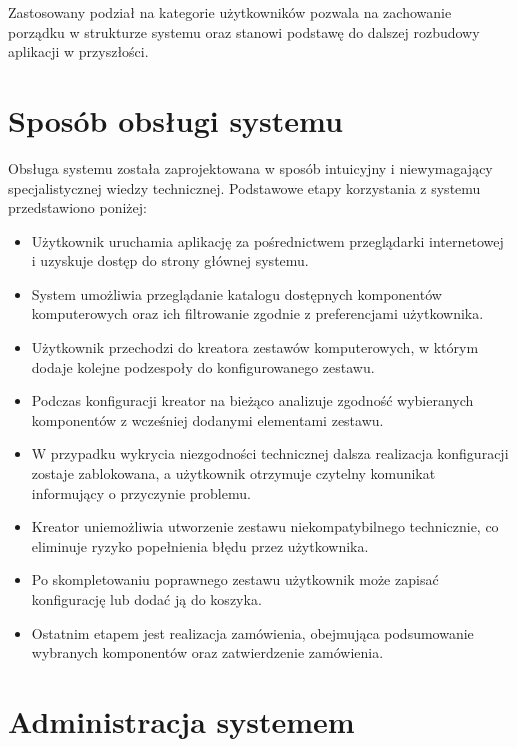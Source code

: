 \documentclass[a4paper,twoside,12pt]{book}
\begin{document}
Zastosowany podział na kategorie użytkowników pozwala na zachowanie porządku w
strukturze systemu oraz stanowi podstawę do dalszej rozbudowy aplikacji w
przyszłości.

\section{Sposób obsługi systemu}

Obsługa systemu została zaprojektowana w sposób intuicyjny i niewymagający
specjalistycznej wiedzy technicznej. Podstawowe etapy korzystania z systemu
przedstawiono poniżej:

\begin{itemize}
    \item Użytkownik uruchamia aplikację za pośrednictwem przeglądarki
    internetowej i uzyskuje dostęp do strony głównej systemu.

    \item System umożliwia przeglądanie katalogu dostępnych komponentów
    komputerowych oraz ich filtrowanie zgodnie z preferencjami użytkownika.

    \item Użytkownik przechodzi do kreatora zestawów komputerowych, w którym
    dodaje kolejne podzespoły do konfigurowanego zestawu.

    \item Podczas konfiguracji kreator na bieżąco analizuje zgodność wybieranych
    komponentów z wcześniej dodanymi elementami zestawu.

    \item W przypadku wykrycia niezgodności technicznej dalsza realizacja
    konfiguracji zostaje zablokowana, a użytkownik otrzymuje czytelny komunikat
    informujący o przyczynie problemu.

    \item Kreator uniemożliwia utworzenie zestawu niekompatybilnego technicznie,
    co eliminuje ryzyko popełnienia błędu przez użytkownika.

    \item Po skompletowaniu poprawnego zestawu użytkownik może zapisać
    konfigurację lub dodać ją do koszyka.

    \item Ostatnim etapem jest realizacja zamówienia, obejmująca podsumowanie
    wybranych komponentów oraz zatwierdzenie zamówienia.
\end{itemize}

\section{Administracja systemem}
\end{document}
